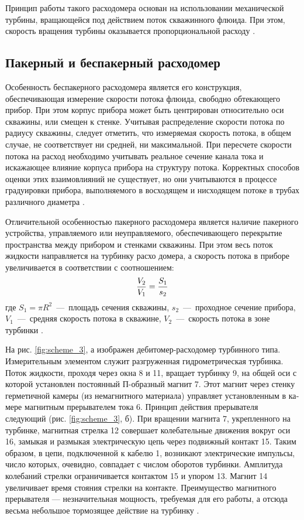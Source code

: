 Принцип работы такого расходомера основан на использовании
механической турбины, вращающейся под действием поток
скважинного флюида. При этом, скорость вращения турбины
оказывается пропорциональной расходу \cite{thermodyn}.

\subsection{Пакерный и беспакерный расходомер}

Особенность беспакерного расходомера является его
конструкция, обеспечивающая измерение скорости потока флюида,
свободно обтекающего прибор. При этом корпус прибора может быть
центрирован относительно оси скважины, или смещен к стенке.
Учитывая распределение скорости потока по радиусу скважины,
следует отметить, что измеряемая скорость потока, в общем случае, не
соответствует ни средней, ни максимальной. При пересчете скорости
потока на расход необходимо учитывать реальное сечение канала тока
и искажающее влияние корпуса прибора на структуру потока.
Корректных способов оценки этих взаимовлияний не существует, но
они учитываются в процессе градуировки прибора, выполняемого в
восходящем и нисходящем потоке в трубах различного диаметра \cite{thermodyn}.

Отличительной особенностью пакерного расходомера является
наличие пакерного устройства, управляемого или неуправляемого,
обеспечивающего перекрытие пространства между прибором и стенками
скважины. При этом весь поток жидкости направляется на турбинку
расхо домера, а скорость потока в приборе увеличивается в соответствии с
соотношением:
$${V_2 \over V_1} = {S_1 \over s_2}$$
где $S_1 = \pi R^2$~---~площадь сечения скважины,
$s_2$~---~проходное сечение прибора,
$V_1$~---~средняя скорость потока в скважине,
$V_2$~---~скорость потока в зоне турбинки \cite{thermodyn}.

На рис. \ref{fig:scheme_3}, а изображен дебитомер-расходомер турбинного типа. Измерительным элементом слу­жит разгруженная гидромет­рическая турбинка. Поток жидко­сти, проходя через окна 8 и 11, вращает турбинку 9, на общей оси с которой установлен постоянный П-образный магнит 7. Этот магнит через стенку герметичной каме­ры (из немагнитного материала) управляет установленным в ка­мере магнитным прерывателем тока 6. Принцип действия преры­вателя следующий (рис. \ref{fig:scheme_3}, б). При вращении магнита 7, укреп­ленного на турбинке, магнитная стрелка 12 совершает колеба­тельные движения вокруг оси 16, замыкая и размыкая электричес­кую цепь через подвижный кон­такт 15. Таким образом, в цепи, подключенной к кабелю 1, возни­кают электрические импульсы, число которых, очевидно, совпа­дает с числом оборотов турбинки. Амплитуда колебаний стрелки ограничивается контактом 15 и упором 13. Магнит 14 увеличи­вает время стояния стрелки на контакте. Преимущество магнитного прерывателя — незначитель­ная мощность, требуемая для его работы, а отсюда весьма неболь­шое тормозящее действие на турбинку \cite{mechdebit}.

